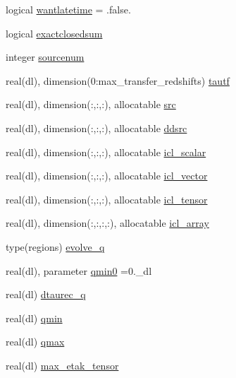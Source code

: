 \begin{DoxyCompactItemize}
\item 
logical \mbox{\hyperlink{namespacecambmain_a2ce96c9fd586b264b5601a12a8903a31}{wantlatetime}} = .false.
\item 
logical \mbox{\hyperlink{namespacecambmain_a2ded9daf3b231818ba6168f15ce0c90f}{exactclosedsum}}
\item 
integer \mbox{\hyperlink{namespacecambmain_a7874020426cc2db0dd79451dce8e4476}{sourcenum}}
\item 
real(dl), dimension(0\+:max\+\_\+transfer\+\_\+redshifts) \mbox{\hyperlink{namespacecambmain_a24c75595b15c8996bc6bc65a8bcf3cad}{tautf}}
\item 
real(dl), dimension(\+:,\+:,\+:), allocatable \mbox{\hyperlink{namespacecambmain_a799546cf5b0652ca67395d086e02912a}{src}}
\item 
real(dl), dimension(\+:,\+:,\+:), allocatable \mbox{\hyperlink{namespacecambmain_a3a07a99a808d7449c0ca61a9df448594}{ddsrc}}
\item 
real(dl), dimension(\+:,\+:,\+:), allocatable \mbox{\hyperlink{namespacecambmain_ae6d811821c995ff2a5bda416a8696ae7}{icl\+\_\+scalar}}
\item 
real(dl), dimension(\+:,\+:,\+:), allocatable \mbox{\hyperlink{namespacecambmain_a2044e91de72f6f3c0c0e2f87ab2c6a04}{icl\+\_\+vector}}
\item 
real(dl), dimension(\+:,\+:,\+:), allocatable \mbox{\hyperlink{namespacecambmain_ad09fccee49c220454529f80e65beb489}{icl\+\_\+tensor}}
\item 
real(dl), dimension(\+:,\+:,\+:,\+:), allocatable \mbox{\hyperlink{namespacecambmain_a34fbba5156bf16dc5e9131c1936bf47c}{icl\+\_\+array}}
\item 
type(regions) \mbox{\hyperlink{namespacecambmain_a5ec3a97db7f68f99f47c3b077bbe3cda}{evolve\+\_\+q}}
\item 
real(dl), parameter \mbox{\hyperlink{namespacecambmain_ac2494adca6c0269bd275ac6125de266c}{qmin0}} =0.\+\_\+dl
\item 
real(dl) \mbox{\hyperlink{namespacecambmain_a0c8e31379dc1ff5e59d2da0bf1afcb8f}{dtaurec\+\_\+q}}
\item 
real(dl) \mbox{\hyperlink{namespacecambmain_a5c0dcf87d7d21c1159e4eccad5b679ef}{qmin}}
\item 
real(dl) \mbox{\hyperlink{namespacecambmain_abb9b39e7c9db24515f7e239e94831b1b}{qmax}}
\item 
real(dl) \mbox{\hyperlink{namespacecambmain_a16f888ec18bcb88fb88b604ee1c858de}{max\+\_\+etak\+\_\+tensor}}

\end{DoxyCompactItemize}
